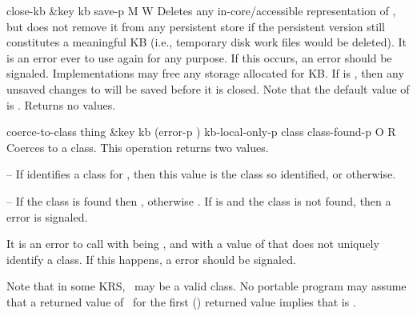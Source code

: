 \begin{okbcop}{close-kb}{ \&key kb save-p} { \void } { M } { W } {  }
Deletes any in-core/accessible representation of , but does not
   remove it from any persistent store if the persistent version still
   constitutes a meaningful KB (i.e., temporary disk work files would be
   deleted).  It is an error ever to use  again for any purpose.  If
   this occurs, an  error should be signaled.
   Implementations may free any storage allocated for KB.  If 
   is \true, then any unsaved changes to  will be saved
   before it is closed.  Note that the default value of 
   is \false.  Returns no values.
\end{okbcop}

\begin{okbcop}{coerce-to-class}{ thing \&key kb (error-p \true) kb-local-only-p} { class class-found-p } { O } { R } {  }
Coerces  to a class.  This operation returns two values.
   \bitem
   \item {} -- If  identifies a class for ,
                           then this value is the class so identified, or
                           \false otherwise.
   \item {} -- If the class is found then \true,
                                   otherwise \false.
   \eitem
   If  is \true and the class is not found, then a
    error is signaled.

   It is an error to call  with  being
   \true, and with a value of  that does not uniquely identify
   a class.  If this happens, a  error should be
   signaled.

   Note that in some KRS, \false\ may be a valid class.  No portable
   program may assume that a returned value of \false\ for the first
   () returned value implies that 
   is \false.
\end{okbcop}


